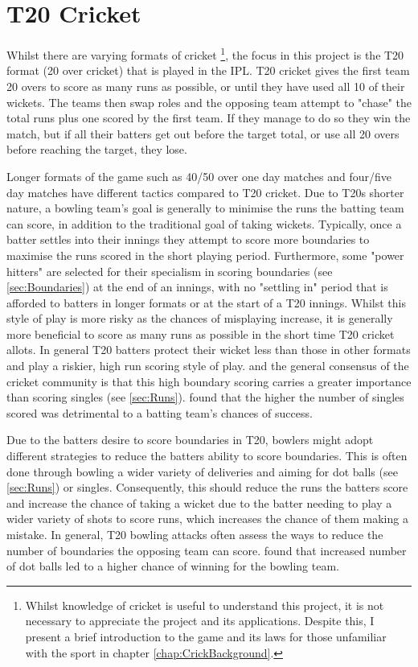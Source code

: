 \documentclass[12pt,a4paper]{report}
\theoremstyle{definition}
\begin{document}
\section{T20 Cricket} \label{sec:T20Cricket}

Whilst there are varying formats of cricket \footnote{Whilst knowledge of cricket is useful to understand this project, it is not necessary to appreciate the project and its applications. Despite this, I present a brief introduction to the game and its laws for those unfamiliar with the sport in chapter \ref{chap:CrickBackground}.}, the focus in this project is the T20 format (20 over cricket) that is played in the IPL.
T20 cricket gives the first team 20 overs to score as many runs as possible, or until they have used all 10 of their wickets.
The teams then swap roles and the opposing team attempt to "chase" the total runs plus one scored by the first team. 
If they manage to do so they win the match, but if all their batters get out before the target total, or use all 20 overs before reaching the target, they lose.

Longer formats of the game such as 40/50 over one day matches and four/five day matches have different tactics compared to T20 cricket.
Due to T20s shorter nature, a bowling team's goal is generally to minimise the runs the batting team can score, in addition to the traditional goal of taking wickets.
Typically, once a batter settles into their innings they attempt to score more boundaries to maximise the runs scored in the short playing period.
Furthermore, some "power hitters" are selected for their specialism in scoring boundaries (see \ref{sec:Boundaries}) at the end of an innings, with no "settling in" period that is afforded to batters in longer formats or at the start of a T20 innings.
Whilst this style of play is more risky as the chances of misplaying increase, it is generally more beneficial to score as many runs as possible in the short time T20 cricket allots.
In general T20 batters protect their wicket less than those in other formats and play a riskier, high run scoring style of play.
\citet{Irvine2017} and the general consensus of the cricket community is that this high boundary scoring carries a greater importance than scoring singles (see \ref{sec:Runs}). 
\citet{Irvine2017} found that the higher the number of singles scored was detrimental to a batting team's chances of success.

Due to the batters desire to score boundaries in T20, bowlers might adopt different strategies to reduce the batters ability to score boundaries. 
This is often done through bowling a wider variety of deliveries and aiming for dot balls (see \ref{sec:Runs}) or singles.
Consequently, this should reduce the runs the batters score and increase the chance of taking a wicket due to the batter needing to play a wider variety of shots to score runs, which increases the chance of them making a mistake.
In general, T20 bowling attacks often assess the ways to reduce the number of boundaries the opposing team can score.
\citet{Irvine2017} found that increased number of dot balls led to a higher chance of winning for the bowling team. 
\end{document}
